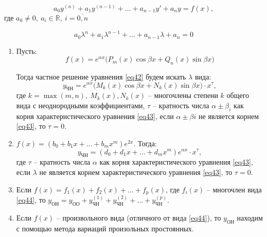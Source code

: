 \begin{note}
    \begin{equation}\label{eq42}
        a_0y^{(n)} + a_1y^{(n-1)} + \ldots + a_{n-1}y' + a_ny = f(x),
    \end{equation}
    где $a_0 \ne 0, \ a_i \in \mathbb{R}, \ i = \overline{0,n}$

    \begin{equation}\label{eq43}
        a_0\lambda^n + a_1\lambda^{n-1} + \ldots + a_{n-1}\lambda + a_n = 0
    \end{equation}

    \begin{enumerate}
        \item Пусть:
              \begin{equation}\label{eq44}
                  f(x) = e^{\alpha x}\big(P_m(x)\cos \beta x + Q_n(x)\sin \beta x \big)
              \end{equation}

              Тогда частное решение уравнения \ref{eq42} будем искать $\lambda$ вида:
              \[
                  y_{\text{ЧН}} = e^{\alpha x}\big(M_k(x)\cos\beta x + N_k(x)\sin \beta x\big)\cdot x^\tau,
              \]
              где $k = \max(m,n), \ M_k(x),N_k(x)$ -- многочлены степени $k$ общего вида с неоднородными коэффициентами, $\tau$ -- кратность числа $\alpha\pm\beta_i$ как корня характеристического уравнения \ref{eq43}, если $\alpha \pm\beta i$ не является корнем \ref{eq43}, то $\tau = 0$.

        \item $f(x) = (b_0 + b_1 x + \ldots + b_m x^m)e^{2x}$. Тогда:
              \[
                  y_{\text{ЧН}} = (d_0 + d_1 x + \ldots + d_m x^m)e^{\alpha x}\cdot x^\tau,
              \]
              где $\tau$ -- кратность числа $\alpha$ как корня характеристического уравнения \ref{eq43}, если $\lambda$ не является корнем характеристического уравнения \ref{eq43}, то $\tau = 0$.

        \item Если $f(x) = f_1(x) + f_2(x) + \ldots + f_p(x)$, где $f_i(x)$ -- многочлен вида \ref{eq44}, то $y_{\text{ОН}} = y_{\text{ОО}} + y_{\text{ЧН}}^{(1)} + y_{\text{ЧН}}^{(2)} + \ldots + y_{\text{ЧН}}^{(p)}$.

        \item Если $f(x)$ -- произвольного вида (отличного от вида \ref{eq44}), то $y_{\text{ОН}}$ находим с помощью метода вариаций произольных простоянных.
    \end{enumerate}
\end{note}


